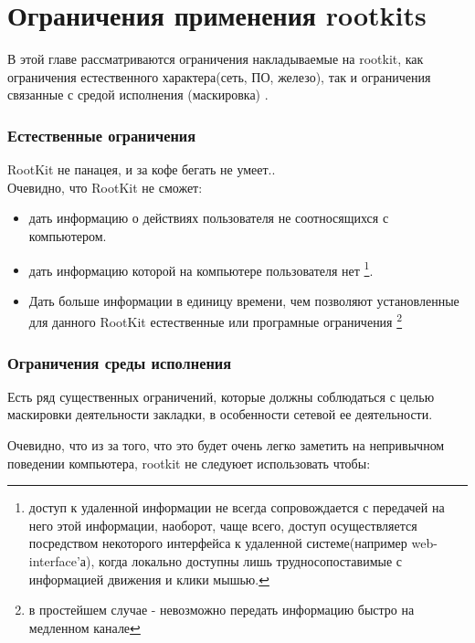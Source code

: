\section{Ограничения применения rootkits} \label{applience_limits}

В этой главе рассматриваются ограничения накладываемые на rootkit,
как ограничения естественного характера(сеть, ПО, железо), так и 
ограничения связанные с средой исполнения (маскировка) .

\subsubsection{Естественные ограничения}

RootKit не панацея, и за кофе бегать не умеет..\\

Очевидно, что RootKit не сможет:

\begin{itemize}

\item{дать информацию о действиях пользователя не соотносящихся с компьютером.}

\item{
 дать информацию которой на компьютере пользователя нет 
\footnote{
 доступ к удаленной
 информации не всегда сопровождается с передачей на него этой информации, наоборот, чаще
 всего, доступ осуществляется посредством некоторого интерфейса к удаленной системе(например
 web-interface'а), когда локально доступны лишь трудносопоставимые с информацией движения
 и клики мышью.
 }.
}

\item{
Дать больше информации в единицу времени, чем позволяют установленные для данного 
RootKit естественные или програмные ограничения \footnote{в простейшем случае - 
невозможно передать информацию быстро на медленном канале}
}

\end{itemize}



\subsubsection{Ограничения среды исполнения}

Есть ряд существенных ограничений, которые должны соблюдаться
с целью маскировки деятельности закладки, в особенности сетевой ее деятельности.

Очевидно, что из за того, что это будет очень легко заметить на непривычном поведении компьютера,
rootkit не следуюет использовать чтобы:

